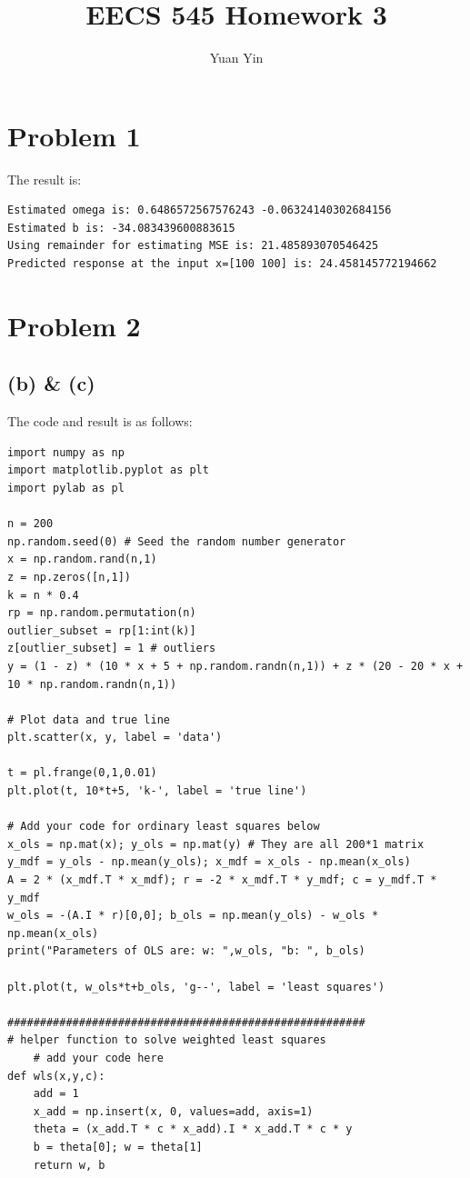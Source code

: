 \documentclass[letterpaper,11pt]{article}
\author{Yuan Yin}
\title{EECS 545 Homework 3}
\begin{document}
\large
\maketitle
\begin{spacing}{1.2}  %
\section*{Problem 1}
The result is:
\begin{lstlisting}
Estimated omega is: 0.6486572567576243 -0.06324140302684156
Estimated b is: -34.083439600883615
Using remainder for estimating MSE is: 21.485893070546425
Predicted response at the input x=[100 100] is: 24.458145772194662
\end{lstlisting}
\section*{Problem 2}
\subsection*{(b) \& (c)}
The code and result is as follows:
\begin{lstlisting}
import numpy as np
import matplotlib.pyplot as plt
import pylab as pl

n = 200
np.random.seed(0) # Seed the random number generator
x = np.random.rand(n,1)
z = np.zeros([n,1])
k = n * 0.4
rp = np.random.permutation(n)
outlier_subset = rp[1:int(k)]
z[outlier_subset] = 1 # outliers
y = (1 - z) * (10 * x + 5 + np.random.randn(n,1)) + z * (20 - 20 * x + 10 * np.random.randn(n,1))

# Plot data and true line
plt.scatter(x, y, label = 'data')

t = pl.frange(0,1,0.01)
plt.plot(t, 10*t+5, 'k-', label = 'true line')

# Add your code for ordinary least squares below
x_ols = np.mat(x); y_ols = np.mat(y) # They are all 200*1 matrix
y_mdf = y_ols - np.mean(y_ols); x_mdf = x_ols - np.mean(x_ols)
A = 2 * (x_mdf.T * x_mdf); r = -2 * x_mdf.T * y_mdf; c = y_mdf.T * y_mdf
w_ols = -(A.I * r)[0,0]; b_ols = np.mean(y_ols) - w_ols * np.mean(x_ols)
print("Parameters of OLS are: w: ",w_ols, "b: ", b_ols)

plt.plot(t, w_ols*t+b_ols, 'g--', label = 'least squares')

#######################################################
# helper function to solve weighted least squares
    # add your code here
def wls(x,y,c):
    add = 1
    x_add = np.insert(x, 0, values=add, axis=1)
    theta = (x_add.T * c * x_add).I * x_add.T * c * y
    b = theta[0]; w = theta[1]
    return w, b


\end{lstlisting}
\end{spacing}
\end{document}
